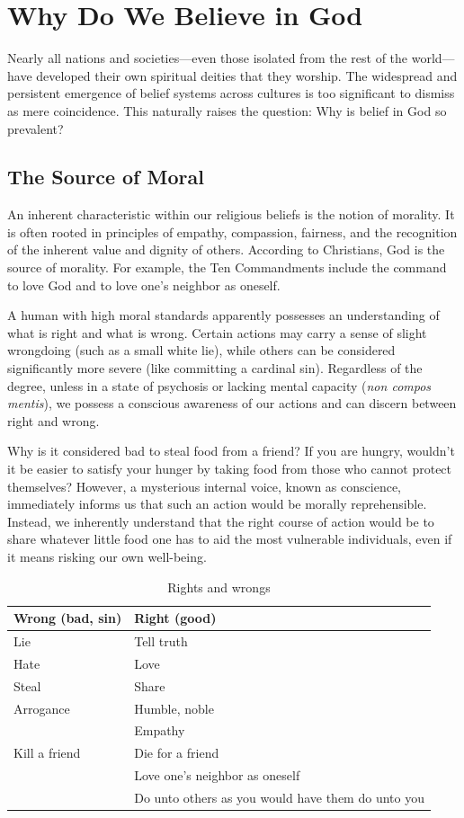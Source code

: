 \chapter{Why Do We Believe in God}
\label{chap:why-do-we-believe}

Nearly all nations and societies—even those isolated from the rest of the world—have developed their own spiritual deities that they worship. 
The widespread and persistent emergence of belief systems across cultures is too significant to dismiss as mere coincidence. 
This naturally raises the question: Why is belief in God so prevalent?

\section{The Source of Moral}

An inherent characteristic within our religious beliefs is the
notion of morality. It is often rooted in principles of empathy,
compassion, fairness, and the recognition of the inherent value
and dignity of others. According to Christians, God is the source
of morality. For example, the Ten Commandments include the command
to love God and to love one's neighbor as oneself.

A human with high moral standards apparently possesses an
understanding of what is right and what is wrong. Certain actions
may carry a sense of slight wrongdoing (such as a small white lie),
while others can be considered significantly more severe (like
committing a cardinal sin). Regardless of the degree, unless in a
state of psychosis or lacking mental capacity (\emph{non compos mentis}),
we possess a conscious awareness of our actions and can discern
between right and wrong.

Why is it considered bad to steal food from a friend? If you are
hungry, wouldn't it be easier to satisfy your hunger by taking food
from those who cannot protect themselves? However, a mysterious
internal voice, known as conscience, immediately informs us that
such an action would be morally reprehensible. Instead, we
inherently understand that the right course of action would be to
share whatever little food one has to aid the most vulnerable
individuals, even if it means risking our own well-being.

\begin{table}[h]
\centering
\caption{Rights and wrongs}
\begin{tabular}{|l|l|}
\hline
\textbf{Wrong (bad, sin)} & \textbf{Right (good)} \\
\hline
Lie & Tell truth \\
Hate & Love \\
Steal & Share \\
Arrogance & Humble, noble \\
 & Empathy \\
Kill a friend & Die for a friend \\
 & Love one's neighbor as oneself \\
 & Do unto others as you would have them do unto you \\
\hline
\end{tabular}
\end{table}

